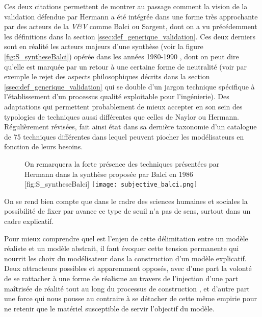Ces deux citations permettent de montrer au passage comment la vision de la validation défendue par Hermann a été intégrée dans une forme très approchante par des acteurs de la \textit{V\&V} comme Balci ou Sargent, dont on a vu précédemment les définitions dans la section \ref{ssec:def_generique_validation}. Ces deux derniers sont en réalité les acteurs majeurs d'une synthèse (voir la figure \ref{fig:S_syntheseBalci}) opérée dans les années 1980-1990 \autocite{Nance2002}, dont on peut dire qu'elle est marquée par un retour à une certaine forme de neutralité (voir par exemple le rejet des aspects philosophiques décrits dans la section \ref{ssec:def_generique_validation} qui se double d'un jargon technique spécifique à l'établissement d'un processus qualité exploitable pour l'ingénierie). Des adaptations qui permettent probablement de mieux accepter en son sein des typologies de techniques aussi différentes que celles de Naylor  ou Hermann. Régulièrement révisées, \textcite{Balci1998} fait ainsi état dans sa dernière taxonomie d'un catalogue de 75 techniques différentes dans lequel peuvent piocher les modélisateurs en fonction de leurs besoins.

\begin{figure}[htbp]
\begin{sidecaption}[fortoc]{On remarquera la forte présence des techniques présentées par Hermann dans la synthèse proposée par Balci en 1986 \autocite{Balci1986}}[fig:S_syntheseBalci]
  \centering
 \texttt{[image: subjective\_balci.png]}
  \end{sidecaption}
\end{figure}

On se rend bien compte que dans le cadre des sciences humaines et sociales la possibilité de fixer par avance ce type de seuil n'a pas de sens, surtout dans un cadre explicatif.


Pour mieux comprendre quel est l'enjeu de cette délimitation entre un modèle réaliste et un modèle abstrait, il faut évoquer cette tension permanente qui nourrit les choix du modélisateur dans la construction d'un modèle explicatif. Deux attracteurs possibles et apparemment opposés, avec d'une part la volonté de se rattacher à une forme de réalisme au travers de l'injection d'une part maîtrisée de réalité tout au long du processus de construction , et d'autre part une force qui nous pousse au contraire à se détacher de cette même empirie pour ne retenir que le matériel susceptible de servir l'objectif du modèle.

